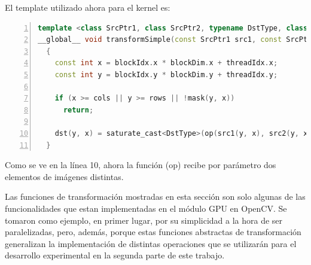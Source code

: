 \documentclass[a4paper,10pt]{report}
\begin{document}
El template utilizado ahora para el kernel es:
 
\begin{lstlisting}[frame=bt,title={aa},caption={modules/cudev/include/opencv2/cudev/grid/detail/transform.hpp},
columns=fullflexible,numbers=left,backgroundcolor=\color{LemonChiffon1},basicstyle=\footnotesize,keywordstyle=\ttfamily\footnotesize,language=C++,stringstyle=\ttfamily,breaklines=true,xleftmargin=0.5em,xrightmargin=0pt,aboveskip=\bigskipamount,belowskip=\bigskipamount]
template <class SrcPtr1, class SrcPtr2, typename DstType, class BinOp, class MaskPtr>
__global__ void transformSimple(const SrcPtr1 src1, const SrcPtr2 src2, GlobPtr<DstType> dst, const BinOp op, const MaskPtr mask, const int rows, const int cols)
  {
    const int x = blockIdx.x * blockDim.x + threadIdx.x;
    const int y = blockIdx.y * blockDim.y + threadIdx.y;

    if (x >= cols || y >= rows || !mask(y, x))
      return;

    dst(y, x) = saturate_cast<DstType>(op(src1(y, x), src2(y, x)));
  }
\end{lstlisting}



Como se ve en la línea 10, ahora la función (op) recibe por parámetro dos elementos de imágenes distintas.





Las funciones de transformación mostradas en esta sección son solo algunas de las funcionalidades que estan implementadas en el módulo GPU en OpenCV. 
Se tomaron como ejemplo, en primer lugar, por su simplicidad a la hora de ser paralelizadas, pero, además, porque estas funciones abstractas de transformación generalizan la implementación
de distintas operaciones que se utilizarán para el desarrollo experimental en la segunda parte de este trabajo.
\end{document}
